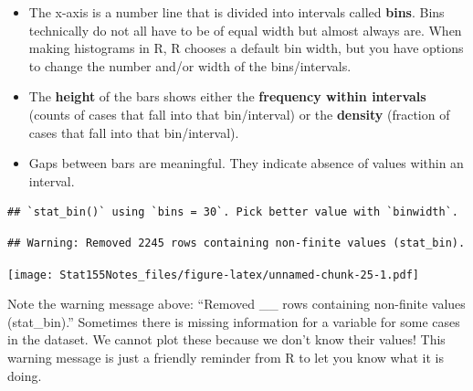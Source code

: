 \documentclass[]{book}
\newenvironment{Shaded}{\begin{snugshade}}{\end{snugshade}}
\newcommand{\DataTypeTok}[1]{\textcolor[rgb]{0.13,0.29,0.53}{#1}}
\newcommand{\KeywordTok}[1]{\textcolor[rgb]{0.13,0.29,0.53}{\textbf{#1}}}
\newcommand{\NormalTok}[1]{#1}
\newcommand{\OperatorTok}[1]{\textcolor[rgb]{0.81,0.36,0.00}{\textbf{#1}}}
\newcommand{\StringTok}[1]{\textcolor[rgb]{0.31,0.60,0.02}{#1}}
\providecommand{\tightlist}{%
  \setlength{\itemsep}{0pt}\setlength{\parskip}{0pt}}
\begin{document}
\begin{itemize}
\tightlist
\item
  The x-axis is a number line that is divided into intervals called \textbf{bins}. Bins technically do not all have to be of equal width but almost always are. When making histograms in R, R chooses a default bin width, but you have options to change the number and/or width of the bins/intervals.
\item
  The \textbf{height} of the bars shows either the \textbf{frequency within intervals} (counts of cases that fall into that bin/interval) or the \textbf{density} (fraction of cases that fall into that bin/interval).
\item
  Gaps between bars are meaningful. They indicate absence of values within an interval.
\end{itemize}

\begin{Shaded}
\end{Shaded}

\begin{verbatim}
## `stat_bin()` using `bins = 30`. Pick better value with `binwidth`.
\end{verbatim}

\begin{verbatim}
## Warning: Removed 2245 rows containing non-finite values (stat_bin).
\end{verbatim}

\texttt{[image: Stat155Notes\_files/figure-latex/unnamed-chunk-25-1.pdf]}

Note the warning message above: ``Removed \_\_ rows containing non-finite values (stat\_bin).'' Sometimes there is missing information for a variable for some cases in the dataset. We cannot plot these because we don't know their values! This warning message is just a friendly reminder from R to let you know what it is doing.
\end{document}
